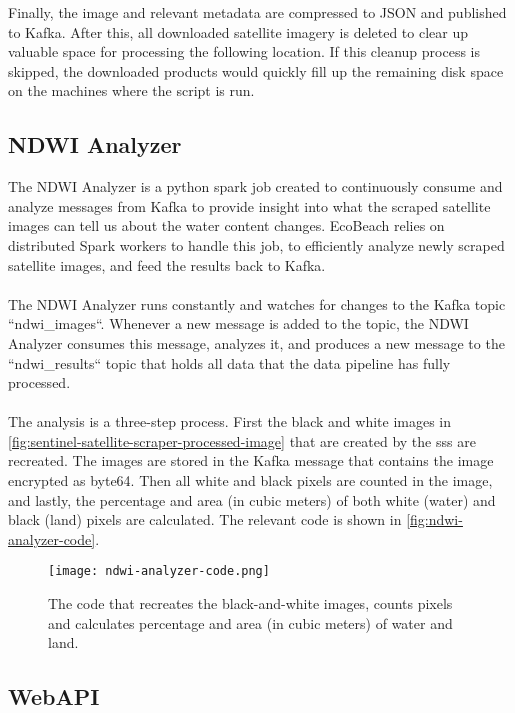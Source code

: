 Finally, the image and relevant metadata are compressed to JSON and published to Kafka. After this, all downloaded satellite imagery is deleted to clear up valuable space for processing the following location. If this cleanup process is skipped, the downloaded products would quickly fill up the remaining disk space on the machines where the script is run.

\subsection{NDWI Analyzer}\label{subsec:ndwi-analyzer}

The NDWI Analyzer is a python spark job created to continuously consume and analyze messages from Kafka to provide insight into what the scraped satellite images can tell us about the water content changes. EcoBeach relies on distributed Spark workers to handle this job, to efficiently analyze newly scraped satellite images, and feed the results back to Kafka.\\\\
\noindent
The NDWI Analyzer runs constantly and watches for changes to the Kafka topic ``ndwi\_images``. Whenever a new message is added to the topic, the NDWI Analyzer consumes this message, analyzes it, and produces a new message to the ``ndwi\_results`` topic that holds all data that the data pipeline has fully processed.\\\\
\noindent
The analysis is a three-step process. First the black and white images in \autoref{fig:sentinel-satellite-scraper-processed-image} that are created by the \acrshort{sss} are recreated. The images are stored in the Kafka message that contains the image encrypted as byte64. Then all white and black pixels are counted in the image, and lastly, the percentage and area (in cubic meters) of both white (water) and black (land) pixels are calculated. The relevant code is shown in \autoref{fig:ndwi-analyzer-code}.

\begin{figure}[h!]
    \centering
    \texttt{[image: ndwi-analyzer-code.png]}
    \caption{The code that recreates the black-and-white images, counts pixels and calculates percentage and area (in cubic meters) of water and land.}
    \label{fig:ndwi-analyzer-code}
\end{figure}

\subsection{WebAPI}

